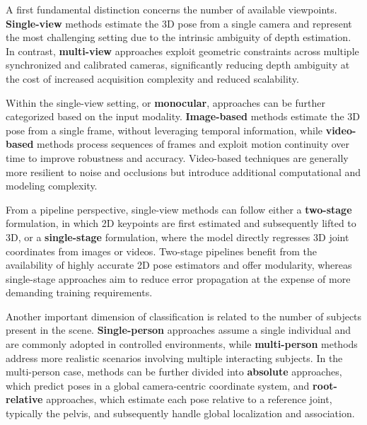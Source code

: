 A first fundamental distinction concerns the number of available viewpoints. \textbf{Single-view} methods estimate the 3D pose from a single camera and represent the most challenging setting due to the intrinsic ambiguity of depth estimation. 
In contrast, \textbf{multi-view} approaches exploit geometric constraints across multiple synchronized and calibrated cameras, significantly reducing depth ambiguity at the cost of increased acquisition complexity and reduced scalability.

Within the single-view setting, or \textbf{monocular}, approaches can be further categorized based on the input modality. \textbf{Image-based} methods estimate the 3D pose from a single frame, without leveraging temporal information, 
while \textbf{video-based} methods process sequences of frames and exploit motion continuity over time to improve robustness and accuracy. Video-based techniques are generally more resilient to noise and occlusions but introduce 
additional computational and modeling complexity.

From a pipeline perspective, single-view methods can follow either a \textbf{two-stage} formulation, in which 2D keypoints are first estimated and subsequently lifted to 3D, or a \textbf{single-stage} formulation, where the model 
directly regresses 3D joint coordinates from images or videos. Two-stage pipelines benefit from the availability of highly accurate 2D pose estimators and offer modularity, whereas single-stage approaches aim to reduce error 
propagation at the expense of more demanding training requirements.


Another important dimension of classification is related to the number of subjects present in the scene. \textbf{Single-person} approaches assume a single individual and are commonly adopted in controlled environments, while 
\textbf{multi-person} methods address more realistic scenarios involving multiple interacting subjects. In the multi-person case, methods can be further divided into \textbf{absolute} approaches, which predict poses in a global 
camera-centric coordinate system, and \textbf{root-relative} approaches, which estimate each pose relative to a reference joint, typically the pelvis, and subsequently handle global localization and association.



